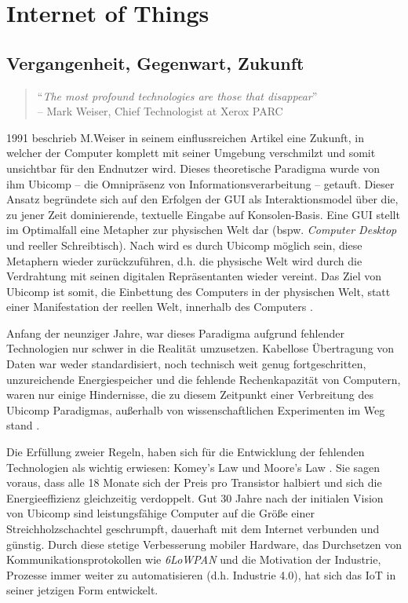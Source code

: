\section{Internet of Things}
\subsection{Vergangenheit, Gegenwart, Zukunft}
\begin{quote}
"`\textit{The most profound technologies are those that disappear}"' \\-- Mark Weiser, Chief Technologist at Xerox PARC \cite{weiser1991computer}
\end{quote}

1991 beschrieb M.Weiser in seinem einflussreichen Artikel \cite{weiser1991computer} eine Zukunft, in welcher der Computer komplett mit seiner Umgebung verschmilzt und somit unsichtbar für den Endnutzer wird. Dieses theoretische Paradigma wurde von ihm \ac{Ubicomp} -- die Omnipräsenz von Informationsverarbeitung -- getauft. Dieser Ansatz begründete sich auf den Erfolgen der \ac{GUI} als Interaktionsmodel über die, zu jener Zeit dominierende, textuelle Eingabe auf Konsolen-Basis. Eine \ac{GUI} stellt im Optimalfall eine Metapher zur physischen Welt dar (bspw. \textit{Computer Desktop} und reeller Schreibtisch). Nach \cite{weiser1991computer} wird es durch \ac{Ubicomp} möglich sein, diese Metaphern wieder zurückzuführen, d.h. die physische Welt wird durch die Verdrahtung mit seinen digitalen Repräsentanten wieder vereint. Das Ziel von \ac{Ubicomp} ist somit, die Einbettung des Computers in der physischen Welt, statt einer Manifestation der reellen Welt, innerhalb des Computers \cite{lyytinen2002ubiquitous}. 

Anfang der neunziger Jahre, war dieses Paradigma aufgrund fehlender Technologien nur schwer in die Realität umzusetzen. Kabellose Übertragung von Daten war weder standardisiert, noch technisch weit genug fortgeschritten, unzureichende Energiespeicher und die fehlende Rechenkapazität von Computern, waren nur einige Hindernisse, die zu diesem Zeitpunkt einer Verbreitung des \ac{Ubicomp} Paradigmas, außerhalb von wissenschaftlichen Experimenten im Weg stand \cite{lyytinen2002ubiquitous}.

Die Erfüllung zweier Regeln, haben sich für die Entwicklung der fehlenden Technologien als wichtig erwiesen: Komey's Law \cite{koomey2010law} und Moore's Law \cite{schaller1997moore}. Sie sagen voraus, dass alle 18 Monate sich der Preis pro Transistor halbiert und sich die Energieeffizienz gleichzeitig verdoppelt. Gut 30 Jahre nach der initialen Vision von \ac{Ubicomp} sind leistungsfähige Computer auf die Größe einer Streichholzschachtel geschrumpft, dauerhaft mit dem Internet verbunden und günstig. Durch diese stetige Verbesserung mobiler Hardware, das Durchsetzen von Kommunikationsprotokollen wie \textit{6LoWPAN} und die Motivation der Industrie, Prozesse immer weiter zu automatisieren (d.h. Industrie 4.0), hat sich das \acf{IoT} in seiner jetzigen Form entwickelt.


